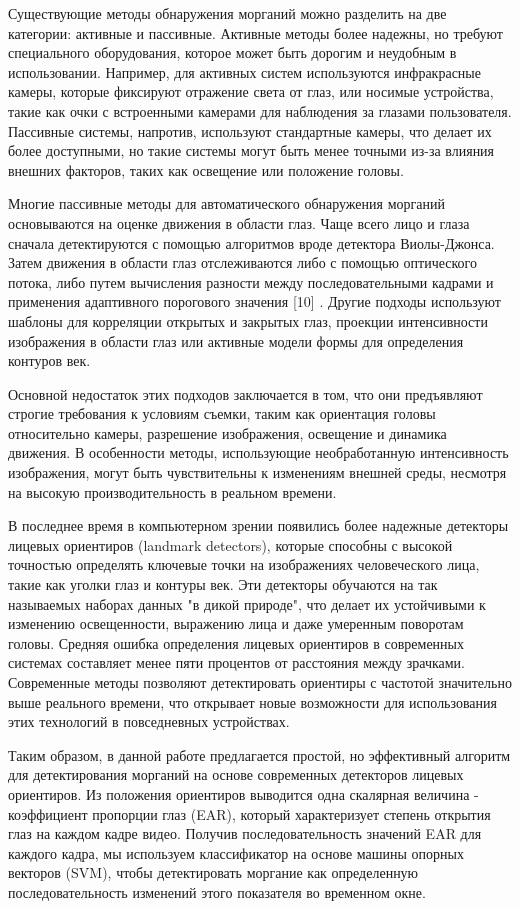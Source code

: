 \begin{multicols}{2}
Существующие методы обнаружения морганий можно разделить на две
категории: активные и пассивные. Активные методы более надежны, но
требуют специального оборудования, которое может быть дорогим и
неудобным в использовании. Например, для активных систем используются
инфракрасные камеры, которые фиксируют отражение света от глаз, или
носимые устройства, такие как очки с встроенными камерами для наблюдения
за глазами пользователя. Пассивные системы, напротив, используют
стандартные камеры, что делает их более доступными, но такие системы
могут быть менее точными из-за влияния внешних факторов, таких как
освещение или положение головы.

Многие пассивные методы для автоматического обнаружения морганий
основываются на оценке движения в области глаз. Чаще всего лицо и глаза
сначала детектируются с помощью алгоритмов вроде детектора Виолы-Джонса.
Затем движения в области глаз отслеживаются либо с помощью оптического
потока, либо путем вычисления разности между последовательными кадрами и
применения адаптивного порогового значения {[}10{]} . Другие подходы
используют шаблоны для корреляции открытых и закрытых глаз, проекции
интенсивности изображения в области глаз или активные модели формы для
определения контуров век.

Основной недостаток этих подходов заключается в том, что они предъявляют
строгие требования к условиям съемки, таким как ориентация головы
относительно камеры, разрешение изображения, освещение и динамика
движения. В особенности методы, использующие необработанную
интенсивность изображения, могут быть чувствительны к изменениям внешней
среды, несмотря на высокую производительность в реальном времени.

В последнее время в компьютерном зрении появились более надежные
детекторы лицевых ориентиров (landmark detectors), которые способны с
высокой точностью определять ключевые точки на изображениях
человеческого лица, такие как уголки глаз и контуры век. Эти детекторы
обучаются на так называемых наборах данных "в дикой природе", что делает
их устойчивыми к изменению освещенности, выражению лица и даже умеренным
поворотам головы. Средняя ошибка определения лицевых ориентиров в
современных системах составляет менее пяти процентов от расстояния между
зрачками. Современные методы позволяют детектировать ориентиры с
частотой значительно выше реального времени, что открывает новые
возможности для использования этих технологий в повседневных
устройствах.

Таким образом, в данной работе предлагается простой, но эффективный
алгоритм для детектирования морганий на основе современных детекторов
лицевых ориентиров. Из положения ориентиров выводится одна скалярная
величина - коэффициент пропорции глаз (EAR), который характеризует
степень открытия глаз на каждом кадре видео. Получив последовательность
значений EAR для каждого кадра, мы используем классификатор на основе
машины опорных векторов (SVM), чтобы детектировать моргание как
определенную последовательность изменений этого показателя во временном
окне.


\end{multicols}
